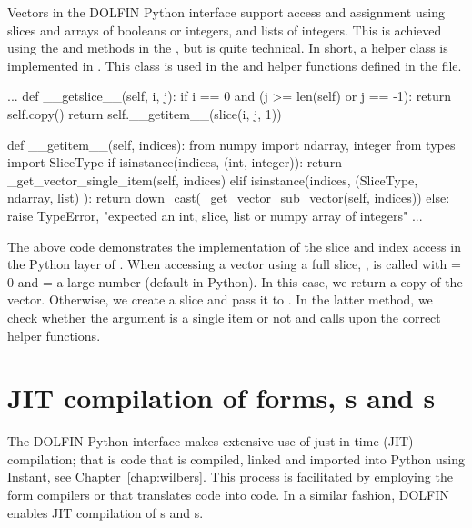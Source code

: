 Vectors in the DOLFIN Python interface support access and assignment using slices and
\numpy arrays of booleans or integers, and lists of integers. This
is achieved using the  and  methods in the
, but is quite technical. In short, a helper class
 is implemented in . This class is used in
the  and  helper functions defined
in the  file.
\begin{python}
   ...
    def __getslice__(self, i, j):
        if i == 0 and (j >= len(self) or j == -1):
            return self.copy()
        return self.__getitem__(slice(i, j, 1))

    def __getitem__(self, indices):
        from numpy import ndarray, integer
        from types import SliceType
        if isinstance(indices, (int, integer)):
            return _get_vector_single_item(self, indices)
        elif isinstance(indices, (SliceType, ndarray, list) ):
            return down_cast(_get_vector_sub_vector(self, indices))
        else:
            raise TypeError, "expected an int, slice, list or numpy array of integers"
  ...
\end{python}
The above code demonstrates the implementation of the slice and index
access in the Python layer of . When accessing a
vector using a full slice, ,  is called
with  = 0 and  = a-large-number (default in Python).
In this case, we return a copy of the vector. Otherwise, we create a
slice and pass it to . In the latter method, we
check whether the  argument is a single item or not and
calls upon the correct helper functions.

\section{JIT compilation of \ufl forms, s and s}
The DOLFIN Python interface makes extensive use of just in time (JIT) compilation;
that is code that is compiled, linked and imported into Python using
Instant, see Chapter~\ref{chap:wilbers}. This process is facilitated
by employing the form compilers \ffc or \sfc that translates \ufl code
into \ufc code.  In a similar fashion, DOLFIN enables JIT compilation
of s and s.

